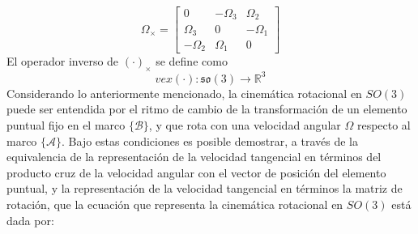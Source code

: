 \documentclass[10pt]{report}
\numberwithin{equation}{chapter}
\numberwithin{algorithm}{chapter}
\newcommand{\bcite}[1]{[\cite{#1}]}
\newcommand{\vect}[1]{\boldsymbol{#1}}
\newcommand{\marco}[1]{\{\mathcal{#1}\}}
\begin{document}
\begin{equation}
\Omega_\times=\begin{bmatrix}0&-\Omega_3&\Omega_2\\
\Omega_3&0&-\Omega_1\\
-\Omega_2&\Omega_1&0\end{bmatrix}
\end{equation}
El operador inverso de $(\cdot)_\times$ se define como 
$$vex(\cdot):\mathfrak{so}(3)\rightarrow\mathbb{R}^3$$
Considerando lo anteriormente mencionado, la cinemática rotacional en $SO(3)$ puede ser entendida por el ritmo de cambio de la transformación de un elemento puntual fijo en el marco $\marco{B}$, y que rota con una velocidad angular $\Omega$ respecto al marco $\marco{A}$. Bajo estas condiciones es posible demostrar, a través de la equivalencia de la representación de la velocidad tangencial en términos del producto cruz de la velocidad angular con el vector de posición del elemento puntual, y la representación de la velocidad tangencial en términos la matriz de rotación, que la ecuación que representa la cinemática rotacional en $SO(3)$ está dada por:
%
%
%
\end{document}
